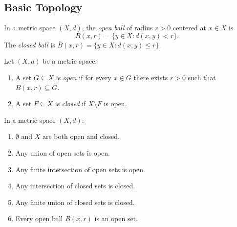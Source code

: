 \documentclass[11pt,a4paper]{article}
\begin{document}
\subsection{Basic Topology}
\label{subsec:topology}

\begin{definition}
\label{def:open_ball}
In a metric space $(X,d)$, the \emph{open ball} of radius $r > 0$ centered at
$x \in X$ is
\[
B(x,r) = \{y \in X : d(x,y) < r\}.
\]
The \emph{closed ball} is $\overline{B}(x,r) = \{y \in X : d(x,y) \le r\}$.
\end{definition}

\begin{definition}
\label{def:open_closed}
Let $(X,d)$ be a metric space.
\begin{enumerate}[nosep,label=(\roman*)]
  \item A set $G \subseteq X$ is \emph{open} if for every $x \in G$ there
    exists $r > 0$ such that $B(x,r) \subseteq G$.
  \item A set $F \subseteq X$ is \emph{closed} if $X \setminus F$ is open.
\end{enumerate}
\end{definition}

\begin{proposition}
\label{prop:open_closed}
In a metric space $(X,d)$:
\begin{enumerate}[nosep,label=(\alph*)]
  \item $\emptyset$ and $X$ are both open and closed.
  \item Any union of open sets is open.
  \item Any finite intersection of open sets is open.
  \item Any intersection of closed sets is closed.
  \item Any finite union of closed sets is closed.
  \item Every open ball $B(x,r)$ is an open set.
\end{enumerate}
\end{proposition}
\end{document}
